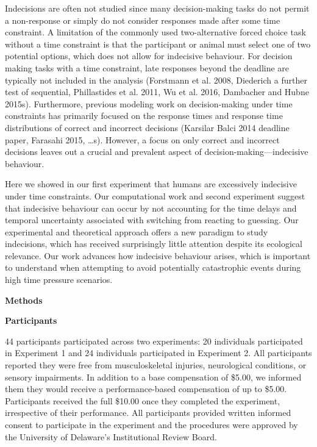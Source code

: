 \documentclass[12pt,letterpaper]{article}
\begin{document}
Indecisions are often not studied since many decision-making tasks do not permit a non-response or simply do not consider responses made after some time constraint. A limitation of the commonly used two-alternative forced choice task without a time constraint is that the participant or animal must select one of two potential options, which does not allow for indecisive behaviour. For decision making tasks with a time constraint, late responses beyond the deadline are typically not included in the analysis (Forstmann et al. 2008, Diederich a further test of sequential, Phillastides et al. 2011, Wu et al. 2016, Dambacher and Hubne 2015s). Furthermore, previous modeling work on decision-making under time constraints has primarily focused on the response times and response time distributions of correct and incorrect decisions (Karsilar Balci 2014 deadline paper, Farasahi 2015, …s). However, a focus on only correct and incorrect decisions leaves out a crucial and prevalent aspect of decision-making—indecisive behaviour.

Here we showed in our first experiment that humans are excessively indecisive under time constraints. Our computational work and second experiment suggest that indecisive behaviour can occur by not accounting for the time delays and temporal uncertainty associated with switching from reacting to guessing. Our experimental and theoretical approach offers a new paradigm to study indecisions, which has received surprisingly little attention despite its ecological relevance. Our work advances how indecisive behaviour arises, which is important to understand when attempting to avoid potentially catastrophic events during high time pressure scenarios.

\noindent\textbf{\large\textcolor{mydarkblue}{Methods}}

\noindent\textbf{Participants}

44 participants participated across two experiments: 20 individuals participated in Experiment 1 and 24 individuals participated in Experiment 2. All participants reported they were free from musculoskeletal injuries, neurological conditions, or sensory impairments. In addition to a base compensation of \$5.00, we informed them they would receive a performance-based compensation of up to \$5.00. Participants received the full \$10.00 once they completed the experiment, irrespective of their performance. All participants provided written informed consent to participate in the experiment and the procedures were approved by the University of Delaware’s Institutional Review Board.
\end{document}
